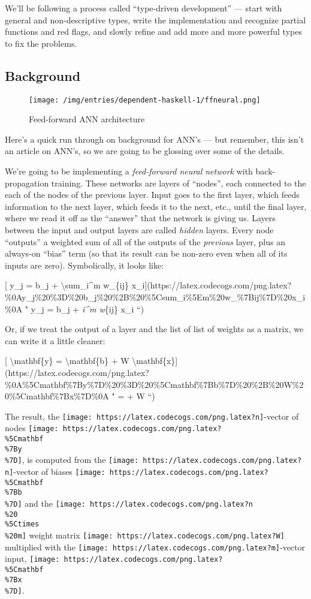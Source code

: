 \documentclass[]{article}
\begin{document}
We'll be following a process called ``type-driven development'' --- start with
general and non-descriptive types, write the implementation and recognize
partial functions and red flags, and slowly refine and add more and more
powerful types to fix the problems.

\hypertarget{background}{%
\subsection{Background}\label{background}}

\begin{figure}
\centering
\texttt{[image: /img/entries/dependent-haskell-1/ffneural.png]}
\caption{Feed-forward ANN architecture}
\end{figure}

Here's a quick run through on background for ANN's --- but remember, this isn't
an article on ANN's, so we are going to be glossing over some of the details.

We're going to be implementing a \emph{feed-forward neural network} with
back-propagation training. These networks are layers of ``nodes'', each
connected to the each of the nodes of the previous layer. Input goes to the
first layer, which feeds information to the next layer, which feeds it to the
next, etc., until the final layer, where we read it off as the ``answer'' that
the network is giving us. Layers between the input and output layers are called
\emph{hidden} layers. Every node ``outputs'' a weighted sum of all of the
outputs of the \emph{previous} layer, plus an always-on ``bias'' term (so that
its result can be non-zero even when all of its inputs are zero). Symbolically,
it looks like:

{[} y\_j = b\_j + \textbackslash{}sum\_i\^{}m w\_\{ij\}
x\_i{]}(https://latex.codecogs.com/png.latex?\%0Ay\_j\%20\%3D\%20b\_j\%20\%2B\%20\%5Csum\_i\%5Em\%20w\_\%7Bij\%7D\%20x\_i\%0A
" y\_j = b\_j + \sum\emph{i\^{}m w}\{ij\} x\_i ``)

Or, if we treat the output of a layer and the list of list of weights as a
matrix, we can write it a little cleaner:

{[} \textbackslash{}mathbf\{y\} = \textbackslash{}mathbf\{b\} + W
\textbackslash{}mathbf\{x\}{]}(https://latex.codecogs.com/png.latex?\%0A\%5Cmathbf\%7By\%7D\%20\%3D\%20\%5Cmathbf\%7Bb\%7D\%20\%2B\%20W\%20\%5Cmathbf\%7Bx\%7D\%0A
"  =  + W  ``)

The result, the \texttt{[image: https://latex.codecogs.com/png.latex?n]}-vector
of nodes
\texttt{[image: https://latex.codecogs.com/png.latex?\\\%5Cmathbf\\\%7By\\\%7D]}, is
computed from the
\texttt{[image: https://latex.codecogs.com/png.latex?n]}-vector of biases
\texttt{[image: https://latex.codecogs.com/png.latex?\\\%5Cmathbf\\\%7Bb\\\%7D]} and
the \texttt{[image: https://latex.codecogs.com/png.latex?n\\\%20\\\%5Ctimes\\\%20m]}
weight matrix \texttt{[image: https://latex.codecogs.com/png.latex?W]}
multiplied with the
\texttt{[image: https://latex.codecogs.com/png.latex?m]}-vector input,
\texttt{[image: https://latex.codecogs.com/png.latex?\\\%5Cmathbf\\\%7Bx\\\%7D]}.
\end{document}
